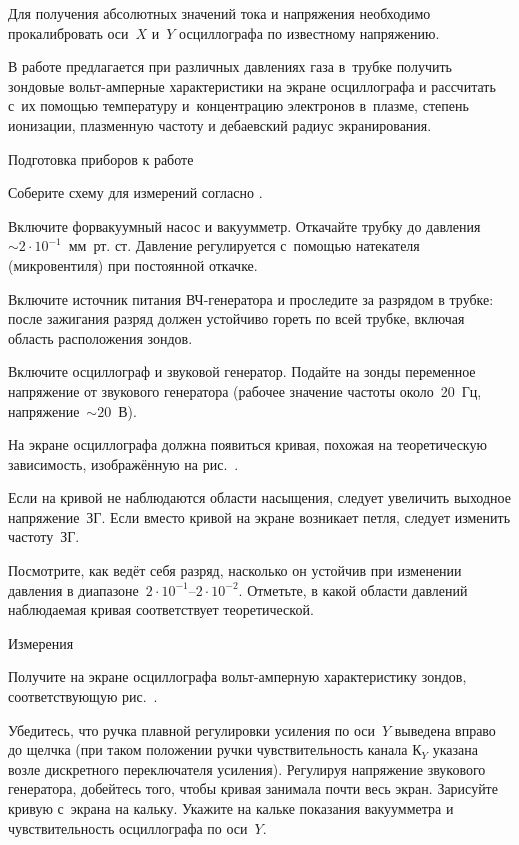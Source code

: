 Для получения абсолютных значений тока и напряжения необходимо прокалибровать оси~$X$ и~$Y$ осциллографа по известному
напряжению.

\zad

В работе предлагается при различных давлениях газа в~трубке получить зондовые вольт-амперные характеристики на экране
осциллографа и рассчитать с~их помощью температуру и~концентрацию электронов в~плазме, степень ионизации, плазменную
частоту и дебаевский радиус экранирования.

\zn Подготовка приборов к работе

\n Соберите схему для измерений согласно .

\n Включите форвакуумный насос и вакуумметр. Откачайте трубку до давления~$\sim 2\cdot10^{-1}$~мм~рт. ст. Давление
регулируется с~помощью натекателя (микровентиля) при постоянной откачке.

\n Включите источник питания ВЧ-генератора и проследите за разрядом в трубке: после зажигания разряд должен устойчиво
гореть по всей трубке, включая область расположения зондов.

\n Включите осциллограф и звуковой генератор. Подайте на зонды переменное напряжение от звукового генератора (рабочее
значение частоты около~20~Гц, напряжение~$\sim20$~В).

На экране осциллографа должна появиться кривая, похожая на теоретическую зависимость, изображённую на рис.~.

Если на кривой не наблюдаются области насыщения, следует увеличить выходное напряжение~ЗГ. Если вместо кривой на экране
возникает петля, следует изменить частоту~ЗГ.

\n[p5] Посмотрите, как ведёт себя разряд, насколько он устойчив при изменении давления в 
диапазоне~$2\cdot10^{-1}$--$2\cdot10^{-2}$. Отметьте, в какой области давлений наблюдаемая кривая соответствует
теоретической.

\zn Измерения

\n[p6] Получите на экране осциллографа вольт-амперную характеристику зондов, соответствующую рис.~.

Убедитесь, что ручка плавной регулировки усиления по оси~$Y$ выведена вправо до щелчка (при таком положении ручки
чувствительность канала К$_Y$ указана возле дискретного переключателя усиления). Регулируя напряжение звукового
генератора, добейтесь того, чтобы кривая занимала почти весь экран. Зарисуйте кривую с~экрана на кальку. Укажите на
кальке показания вакуумметра и чувствительность осциллографа по оси~$Y$.

